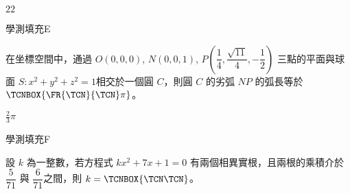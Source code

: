 \begin{QUESTIONS}
\begin{QUESTION}
\begin{QFROMS}
        \end{QFROMS}
        \begin{QTAGS}\end{QTAGS}
        \begin{QANS}
            $22$
        \end{QANS}
        \begin{QSOLLIST}
        \end{QSOLLIST}
        \begin{QEMPTYSPACE}
        \end{QEMPTYSPACE}
    \end{QUESTION}
    \begin{QUESTION}
        \begin{ExamInfo}{92}{學測}{填充}{E}
        \end{ExamInfo}
        \begin{ExamAnsRateInfo}{21}{37}{17}{9}
        \end{ExamAnsRateInfo}
        \begin{QBODY}
            在坐標空間中，通過 $O(0,0,0)$, $N(0,0,1)$, $P(\dfrac{1}{4}, \dfrac{\sqrt{11}}{4}, -\dfrac{1}{2})$ 三點的平面與球面  $S: x^2+y^2+z^2=1$相交於一個圓 $C$，則圓 $C$ 的劣弧 $NP$ 的弧長等於 
            $\TCNBOX{\FR{\TCN}{\TCN} \pi} $。
        \end{QBODY}
        \begin{QFROMS}
        \end{QFROMS}
        \begin{QTAGS}\end{QTAGS}
        \begin{QANS}
            $\frac{2}{3}\pi$
        \end{QANS}
        \begin{QSOLLIST}
        \end{QSOLLIST}
        \begin{QEMPTYSPACE}
        \end{QEMPTYSPACE}
    \end{QUESTION}
    \begin{QUESTION}
        \begin{ExamInfo}{92}{學測}{填充}{F}
        \end{ExamInfo}
        \begin{ExamAnsRateInfo}{35}{67}{31}{7}
        \end{ExamAnsRateInfo}
        \begin{QBODY}
            設 $k$ 為一整數，若方程式 $kx^2 + 7x +1= 0$ 有兩個相異實根，且兩根的乘積介於 $\dfrac{5}{71}$ 與 $\dfrac{6}{71}$之間，則 $k=\TCNBOX{\TCN\TCN}$。

\end{QBODY}
\end{QUESTION}
\end{QUESTIONS}
